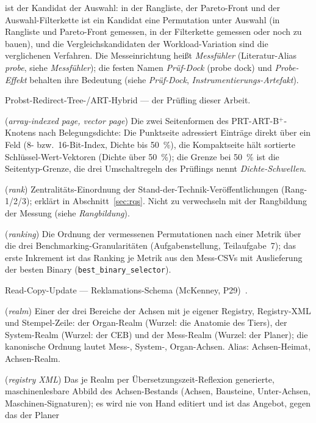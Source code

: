 \begin{description}
  ist der Kandidat der Auswahl: in der Rangliste, der Pareto-Front und der Auswahl-Filterkette ist ein
  Kandidat eine Permutation unter Auswahl (in Rangliste und Pareto-Front gemessen, in der Filterkette
  gemessen oder noch zu bauen), und die Vergleichskandidaten der Workload-Variation sind die verglichenen
  Verfahren. Die Messeinrichtung heißt \emph{Messfühler} (Literatur-Alias \emph{probe}, siehe
  \emph{Messfühler}); die festen Namen \emph{Prüf-Dock} (probe dock) und \emph{Probe-Effekt} behalten ihre
  Bedeutung (siehe \emph{Prüf-Dock}, \emph{Instrumentierungs-Artefakt}).
  \item[PRT-ART] Probst-Redirect-Tree-/ART-Hybrid --- der Prüfling dieser Arbeit.
  \item[Punktseite, Kompaktseite] (\emph{array-indexed page, vector page}) Die zwei Seitenformen
  des PRT-ART-B$^+$-Knotens nach Belegungsdichte: Die Punktseite adressiert Einträge direkt über
  ein Feld (8- bzw.\ 16-Bit-Index, Dichte bis 50~\%), die Kompaktseite hält sortierte
  Schlüssel-Wert-Vektoren (Dichte über 50~\%); die Grenze bei 50~\% ist die Seitentyp-Grenze, die drei
  Umschaltregeln des Prüflings nennt \emph{Dichte-Schwellen}.
  \item[Rang] (\emph{rank}) Zentralitäts-Einordnung der Stand-der-Technik-Veröffentlichungen
  (Rang-1/2/3); erklärt in Abschnitt~\ref{sec:rqs}. Nicht zu verwechseln mit der Rangbildung der
  Messung (siehe \emph{Rangbildung}).
  \item[Rangbildung] (\emph{ranking}) Die Ordnung der vermessenen Permutationen nach einer Metrik
  über die drei Benchmarking-Granularitäten (Aufgabenstellung, Teilaufgabe~7); das erste Inkrement
  ist das Ranking je Metrik aus den Mess-CSVs mit Auslieferung der besten Binary
  (\texttt{best\_binary\_selector}).
  \item[RCU] Read-Copy-Update --- Reklamations-Schema (McKenney, P29)~\cite{mckenney2001rcu}.
  \item[Realm] (\emph{realm}) Einer der drei Bereiche der Achsen mit je eigener Registry,
  Registry-XML und Stempel-Zeile: der Organ-Realm (Wurzel: die Anatomie des Tiers), der
  System-Realm (Wurzel: der CEB) und der Mess-Realm (Wurzel: der Planer); die kanonische Ordnung
  lautet Mess-, System-, Organ-Achsen. Alias: Achsen-Heimat, Achsen-Realm.
  \item[Registry-XML] (\emph{registry XML}) Das je Realm per Übersetzungszeit-Reflexion generierte,
  maschinenlesbare Abbild des Achsen-Bestands (Achsen, Bausteine, Unter-Achsen,
  Maschinen-Signaturen); es wird nie von Hand editiert und ist das Angebot, gegen das der Planer

\end{description}
